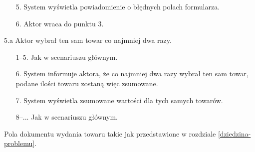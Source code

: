 \begin{usecase}
{\begin{enumerate}
        \item[5.] System wyświetla powiadomienie o błędnych polach formularza.
        \item[6.] Aktor wraca do punktu 3.
      \end{enumerate}
     \item[5.a] Aktor wybrał ten sam towar co najmniej dwa razy.
       \begin{enumerate}
       \item[1--5.] Jak w scenariuszu głównym.
       \item[6.] System informuje aktora, że co najmniej dwa razy wybrał ten sam towar, podane ilości towaru zostaną więc zsumowane.
       \item[7.] System wyświetla zsumowane wartości dla tych samych towarów.
       \item[8--...] Jak w scenariuszu głównym.
       \end{enumerate}
  }
   {
    Pola dokumentu wydania towaru takie jak przedstawione w rozdziale \ref{dziedzina-problemu}.
  }
\end{usecase}

